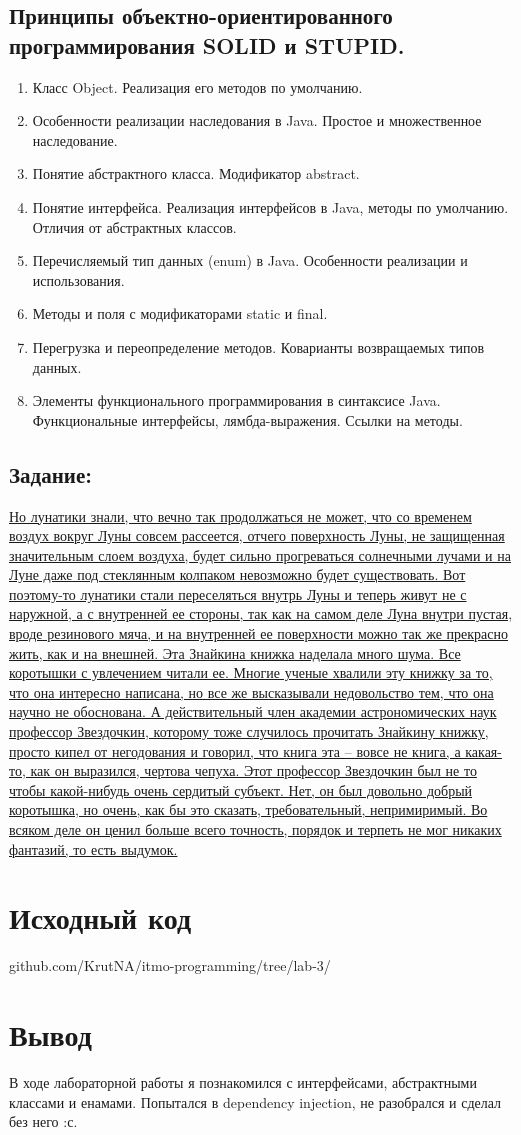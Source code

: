 \documentclass[11pt]{article}
\begin{document}
\subsection{Принципы объектно-ориентированного программирования SOLID и STUPID.}
\label{sec:org87c3ca7}
\begin{enumerate}
\item Класс Object. Реализация его методов по умолчанию.
\item Особенности реализации наследования в Java. Простое и множественное наследование.
\item Понятие абстрактного класса. Модификатор abstract.
\item Понятие интерфейса. Реализация интерфейсов в Java, методы по умолчанию. Отличия от абстрактных классов.
\item Перечисляемый тип данных (enum) в Java. Особенности реализации и использования.
\item Методы и поля с модификаторами static и final.
\item Перегрузка и переопределение методов. Коварианты возвращаемых типов данных.
\item Элементы функционального программирования в синтаксисе Java. Функциональные интерфейсы, лямбда-выражения. Ссылки на методы.
\end{enumerate}

\subsection{Задание:}
\label{sec:org105ab8b}
\uline{Но лунатики знали, что вечно так продолжаться не может, что со временем воздух вокруг Луны совсем рассеется, отчего поверхность Луны, не защищенная значительным слоем воздуха, будет сильно прогреваться солнечными лучами и на Луне даже под стеклянным колпаком невозможно будет существовать. Вот поэтому-то лунатики стали переселяться внутрь Луны и теперь живут не с наружной, а с внутренней ее стороны, так как на самом деле Луна внутри пустая, вроде резинового мяча, и на внутренней ее поверхности можно так же прекрасно жить, как и на внешней. Эта Знайкина книжка наделала много шума. Все коротышки с увлечением читали ее. Многие ученые хвалили эту книжку за то, что она интересно написана, но все же высказывали недовольство тем, что она научно не обоснована. А действительный член академии астрономических наук профессор Звездочкин, которому тоже случилось прочитать Знайкину книжку, просто кипел от негодования и говорил, что книга эта -- вовсе не книга, а какая-то, как он выразился, чертова чепуха. Этот профессор Звездочкин был не то чтобы какой-нибудь очень сердитый субъект. Нет, он был довольно добрый коротышка, но очень, как бы это сказать, требовательный, непримиримый. Во всяком деле он ценил больше всего точность, порядок и терпеть не мог никаких фантазий, то есть выдумок.}

\section{Исходный код}
\label{sec:orgce5eeb3}
github.com/KrutNA/itmo-programming/tree/lab-3/

\section{Вывод}
\label{sec:orgd8b0fcd}
В ходе лабораторной работы я познакомился с интерфейсами, абстрактными классами и енамами. Попытался в dependency injection, не разобрался и сделал без него :с.
\end{document}

